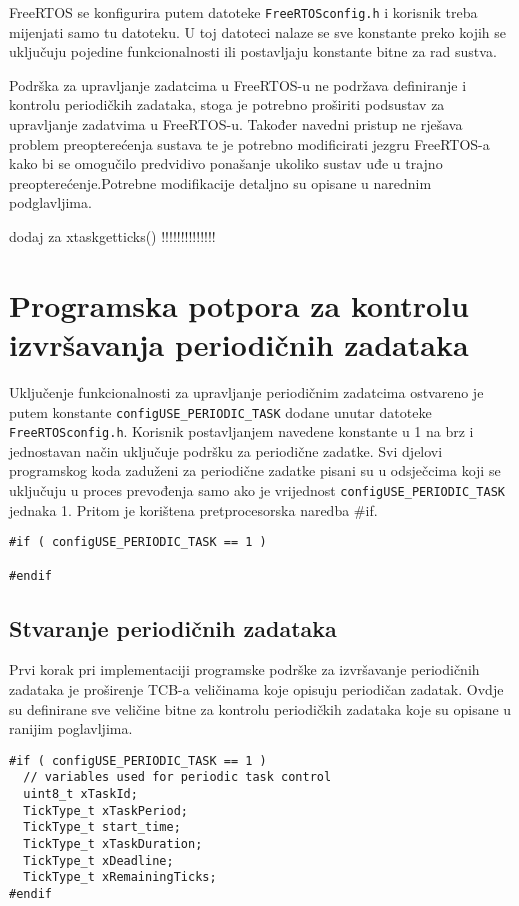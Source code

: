 \documentclass[../zavrsni.tex]{subfiles}
\begin{document}
FreeRTOS se konfigurira putem datoteke \texttt{FreeRTOSconfig.h} i korisnik treba mijenjati samo tu datoteku. U toj datoteci nalaze se 
sve konstante preko kojih se uključuju pojedine funkcionalnosti ili postavljaju konstante bitne za rad sustva.  

Podrška za upravljanje zadatcima u FreeRTOS-u ne podržava definiranje i kontrolu periodičkih zadataka, stoga je potrebno proširiti podsustav 
za upravljanje zadatvima u FreeRTOS-u.
Također navedni pristup ne rješava problem preopterećenja sustava te je potrebno modificirati jezgru FreeRTOS-a kako bi se omogučilo 
predvidivo ponašanje ukoliko sustav uđe u trajno preopterećenje.Potrebne modifikacije detaljno su opisane u narednim podglavljima.

dodaj za xtaskgetticks() !!!!!!!!!!!!!!

\section{Programska potpora za kontrolu izvršavanja periodičnih zadataka}

Uključenje funkcionalnosti za upravljanje periodičnim zadatcima ostvareno je putem konstante \texttt{configUSE\_PERIODIC\_TASK} dodane unutar 
datoteke \texttt{FreeRTOSconfig.h}. Korisnik postavljanjem navedene konstante u 1 na brz i jednostavan način uključuje podršku za periodične zadatke.
Svi djelovi programskog koda zaduženi za periodične zadatke pisani su u odsječcima koji se uključuju u proces prevođenja samo ako je vrijednost 
\texttt{configUSE\_PERIODIC\_TASK} jednaka 1. Pritom je korištena pretprocesorska naredba \#if. 
\begin{lstlisting}[style=CStyle,caption={Pretprocesorska naredba za uključenje periodičnih zadataka},captionpos=b]
#if ( configUSE_PERIODIC_TASK == 1 )

#endif
\end{lstlisting}

\subsection{Stvaranje periodičnih zadataka}

Prvi korak pri implementaciji programske podrške za izvršavanje periodičnih zadataka je proširenje TCB-a veličinama koje opisuju 
periodičan zadatak. Ovdje su definirane sve veličine bitne za kontrolu periodičkih zadataka koje su opisane u ranijim poglavljima.

\begin{lstlisting}[style=CStyle,caption={Varijable dodane u strukturu za kontrolu zadataka},captionpos=b]
#if ( configUSE_PERIODIC_TASK == 1 )
  // variables used for periodic task control    
  uint8_t xTaskId;
  TickType_t xTaskPeriod;
  TickType_t start_time;
  TickType_t xTaskDuration;
  TickType_t xDeadline;
  TickType_t xRemainingTicks;
#endif
\end{lstlisting}
\end{document}

